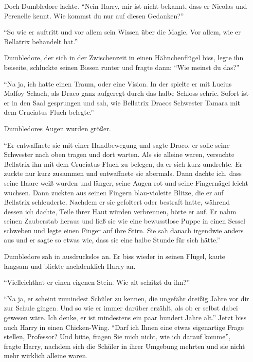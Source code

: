 Doch Dumbledore lachte. \enquote{Nein Harry, mir ist nicht bekannt, dass er Nicolas und Perenelle kennt. Wie kommst du nur auf diesen Gedanken?}

\enquote{So wie er auftritt und vor allem sein Wissen über die Magie. Vor allem, wie er Bellatrix behandelt hat.}

Dumbledore, der sich in der Zwischenzeit in einen Hähnchenflügel biss, legte ihn beiseite, schluckte seinen Bissen runter und fragte dann: \enquote{Wie meinst du das?}

\enquote{Na ja, ich hatte einen Traum, oder eine Vision. In der spielte er mit Lucius Malfoy Schach, als Draco ganz aufgeregt durch das halbe Schloss schrie. Sofort ist er in den Saal gesprungen und sah, wie Bellatrix Dracos Schwester Tamara mit dem Cruciatus-Fluch belegte.}

Dumbledores Augen wurden größer.

\enquote{Er entwaffnete sie mit einer Handbewegung und sagte Draco, er solle seine Schwester nach oben tragen und dort warten. Als sie alleine waren, versuchte Bellatrix ihn mit dem Cruciatus-Fluch zu belegen, da er sich kurz umdrehte. Er zuckte nur kurz zusammen und entwaffnete sie abermals. Dann dachte ich, dass seine Haare weiß wurden und länger, seine Augen rot und seine Fingernägel leicht wuchsen. Dann zuckten aus seinen Fingern blau-violette Blitze, die er auf Bellatrix schleuderte. Nachdem er sie gefoltert oder bestraft hatte, während dessen ich dachte, Teile ihrer Haut würden verbrennen, hörte er auf. Er nahm seinen Zauberstab heraus und ließ sie wie eine bewusstlose Puppe in einen Sessel schweben und legte einen Finger auf ihre Stirn. Sie sah danach irgendwie anders aus und er sagte so etwas wie, dass sie eine halbe Stunde für sich hätte.}

Dumbledore sah in ausdruckslos an. Er biss wieder in seinen Flügel, kaute langsam und blickte nachdenklich Harry an.

\enquote{Vielleicht\abs hat er einen eigenen Stein. \gst Wie alt schätzt du ihn?}

\enquote{Na ja, er scheint zumindest Schüler zu kennen, die ungefähr dreißig Jahre vor dir zur Schule gingen. Und so wie er immer darüber erzählt, als ob er selbst dabei gewesen wäre. Ich denke, er ist mindestens ein paar hundert Jahre alt.} Jetzt biss auch Harry in einen Chicken-Wing. \enquote{Darf ich Ihnen eine etwas eigenartige Frage stellen, Professor? Und bitte, fragen Sie mich nicht, wie ich darauf komme}, fragte Harry, nachdem sich die Schüler in ihrer Umgebung mehrten und sie nicht mehr wirklich alleine waren.

